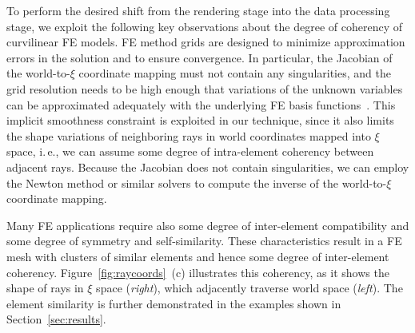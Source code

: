\documentclass[journal]{vgtc}                %
\begin{document}
To perform the desired shift from the rendering stage into the data processing stage, we exploit the following key observations about the degree of coherency of curvilinear FE models. FE method grids are designed to minimize approximation errors in the solution and to ensure convergence. In particular, the Jacobian of the world-to-$\xi$ coordinate mapping must not contain any singularities, and the grid resolution needs to be high enough that variations of the unknown variables can be approximated adequately with the underlying FE basis functions~\cite{knupp07meshquality}. This implicit smoothness constraint is exploited in our technique, since it also limits the shape variations of neighboring rays in world coordinates mapped into $\xi$ space, i.\,e., we can assume some degree of intra-element coherency between adjacent rays. Because the Jacobian does not contain singularities, we can employ the Newton method or similar solvers to compute the inverse of the world-to-$\xi$ coordinate mapping.

Many FE applications require also some degree of inter-element compatibility and some degree of symmetry and self-similarity. These characteristics result in a FE mesh with clusters of similar elements and hence some degree of inter-element coherency. Figure~\ref{fig:raycoords}~(c) illustrates this coherency, as it shows the shape of rays in $\xi$ space ({\it right}), which adjacently traverse world space ({\it left}). The element similarity is further demonstrated in the examples shown in Section~\ref{sec:results}.
\end{document}
